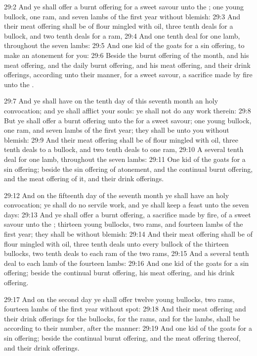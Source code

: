 29:2 And ye shall offer a burnt offering for a sweet savour unto the \LORD; one young bullock, one ram, and seven lambs of the first year without blemish: 29:3 And their meat offering shall be of flour mingled with oil, three tenth deals for a bullock, and two tenth deals for a ram, 29:4 And one tenth deal for one lamb, throughout the seven lambs: 29:5 And one kid of the goats for a sin offering, to make an atonement for you: 29:6 Beside the burnt offering of the month, and his meat offering, and the daily burnt offering, and his meat offering, and their drink offerings, according unto their manner, for a sweet savour, a sacrifice made by fire unto the \LORD.

29:7 And ye shall have on the tenth day of this seventh month an holy convocation; and ye shall afflict your souls: ye shall not do any work therein: 29:8 But ye shall offer a burnt offering unto the \LORD for a sweet savour; one young bullock, one ram, and seven lambs of the first year; they shall be unto you without blemish: 29:9 And their meat offering shall be of flour mingled with oil, three tenth deals to a bullock, and two tenth deals to one ram, 29:10 A several tenth deal for one lamb, throughout the seven lambs: 29:11 One kid of the goats for a sin offering; beside the sin offering of atonement, and the continual burnt offering, and the meat offering of it, and their drink offerings.

29:12 And on the fifteenth day of the seventh month ye shall have an holy convocation; ye shall do no servile work, and ye shall keep a feast unto the \LORD seven days: 29:13 And ye shall offer a burnt offering, a sacrifice made by fire, of a sweet savour unto the \LORD; thirteen young bullocks, two rams, and fourteen lambs of the first year; they shall be without blemish: 29:14 And their meat offering shall be of flour mingled with oil, three tenth deals unto every bullock of the thirteen bullocks, two tenth deals to each ram of the two rams, 29:15 And a several tenth deal to each lamb of the fourteen lambs: 29:16 And one kid of the goats for a sin offering; beside the continual burnt offering, his meat offering, and his drink offering.

29:17 And on the second day ye shall offer twelve young bullocks, two rams, fourteen lambs of the first year without spot: 29:18 And their meat offering and their drink offerings for the bullocks, for the rams, and for the lambs, shall be according to their number, after the manner: 29:19 And one kid of the goats for a sin offering; beside the continual burnt offering, and the meat offering thereof, and their drink offerings.

